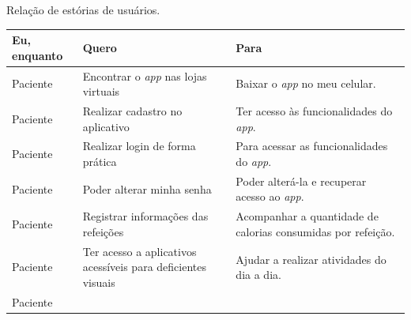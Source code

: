 \begin{quadro}[htb]
    \begin{center}
        \ABNTEXfontereduzida
        \caption{Relação de estórias de usuários.}
        \label{qua-est-usr}
        \begin{tabular}{|p{2.0cm}|p{5.0cm}|p{7.0cm}|}
            \hline
            \textbf{Eu, enquanto}                                          & \textbf{Quero} & \textbf{Para}                     \\
            \hline
            Paciente                                                       &
            Encontrar o \emph{app} nas lojas virtuais                      &
            Baixar o \emph{app} no meu celular.                                                                                 \\
            \hline
            Paciente                                                       &
            Realizar cadastro no aplicativo                                &
            Ter acesso às funcionalidades do \emph{app}.                                                                        \\
            \hline
            Paciente                                                       &
            Realizar login de forma prática                                &
            Para acessar as funcionalidades do \emph{app}.                                                                      \\
            \hline
            Paciente                                                       &
            Poder alterar minha senha                                      &
            Poder alterá\@-la e recuperar acesso ao \emph{app}.                                                                 \\
            \hline
            Paciente                                                       &
            Registrar informações das refeições                            &
            Acompanhar a quantidade de calorias consumidas por refeição.                                                        \\
            \hline
            Paciente                                                       &
            Ter acesso a aplicativos acessíveis para deficientes visuais   &
            Ajudar a realizar atividades do dia a dia.                                                                          \\
            \hline
            Paciente                                                       &

\end{tabular}
\end{center}
\end{quadro}
